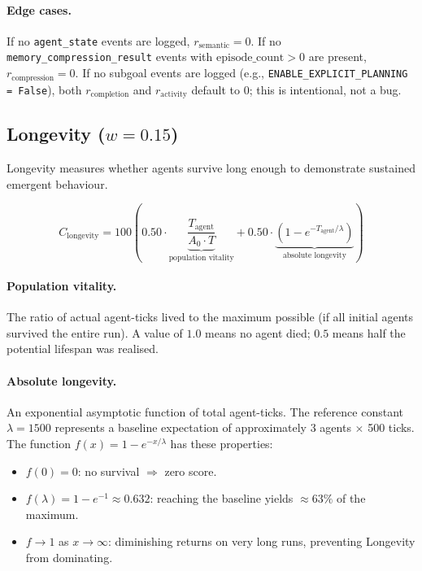 \documentclass[a4paper, 11pt]{article}
\begin{document}
\paragraph{Edge cases.} If no \texttt{agent\_state} events are logged, $r_{\text{semantic}} = 0$. If no \texttt{memory\_compression\_result} events with $\text{episode\_count} > 0$ are present, $r_{\text{compression}} = 0$. If no subgoal events are logged (e.g., \texttt{ENABLE\_EXPLICIT\_PLANNING = False}), both $r_{\text{completion}}$ and $r_{\text{activity}}$ default to $0$; this is intentional, not a bug.

\subsection{Longevity ($w = 0.15$)}

Longevity measures whether agents survive long enough to demonstrate sustained emergent behaviour.

\begin{equation}
C_{\text{longevity}} = 100 \left(
    0.50 \cdot \underbrace{\frac{T_{\text{agent}}}{A_0 \cdot T}}_{\text{population vitality}}
    + 0.50 \cdot \underbrace{\left(1 - e^{-T_{\text{agent}} / \lambda}\right)}_{\text{absolute longevity}}
\right)
\label{eq:longevity}
\end{equation}

\paragraph{Population vitality.} The ratio of actual agent-ticks lived to the maximum possible (if all initial agents survived the entire run). A value of $1.0$ means no agent died; $0.5$ means half the potential lifespan was realised.

\paragraph{Absolute longevity.} An exponential asymptotic function of total agent-ticks. The reference constant $\lambda = 1500$ represents a baseline expectation of approximately 3 agents $\times$ 500 ticks. The function $f(x) = 1 - e^{-x/\lambda}$ has these properties:
\begin{itemize}[nosep]
    \item $f(0) = 0$: no survival $\Rightarrow$ zero score.
    \item $f(\lambda) = 1 - e^{-1} \approx 0.632$: reaching the baseline yields $\approx 63\%$ of the maximum.
    \item $f \to 1$ as $x \to \infty$: diminishing returns on very long runs, preventing Longevity from dominating.
\end{itemize}
\end{document}
